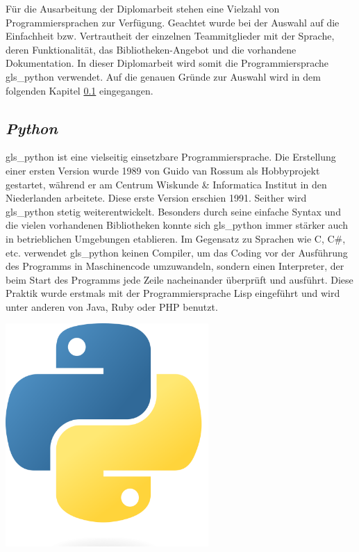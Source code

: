 Für die Ausarbeitung der Diplomarbeit stehen eine Vielzahl von Programmiersprachen zur Verfügung. Geachtet wurde bei der Auswahl auf die Einfachheit bzw. Vertrautheit der einzelnen Teammitglieder mit der Sprache, deren Funktionalität, das Bibliotheken-Angebot und die vorhandene Dokumentation. In dieser Diplomarbeit wird somit die Programmiersprache \gls{gls_python} verwendet. Auf die genauen Gründe zur Auswahl wird in dem folgenden Kapitel \ref{python_kapitel} eingegangen.

\subsection{\textit{Python}}\label{python_kapitel}
\begin{minipage}{0.6\textwidth}
	\gls{gls_python} ist eine vielseitig einsetzbare Programmiersprache. Die Erstellung einer ersten Version wurde 1989 von Guido van Rossum als Hobbyprojekt gestartet, während er am Centrum Wiskunde \& Informatica Institut in den Niederlanden arbeitete. Diese erste Version erschien 1991. Seither wird \gls{gls_python} stetig weiterentwickelt. Besonders durch seine einfache Syntax und die vielen vorhandenen Bibliotheken konnte sich \gls{gls_python} immer stärker auch in betrieblichen Umgebungen etablieren. Im Gegensatz zu Sprachen wie C, C\#, etc. verwendet \gls{gls_python} keinen Compiler, um das Coding vor der Ausführung des Programms in Maschinencode umzuwandeln, sondern einen Interpreter, der beim Start des Programms jede Zeile nacheinander überprüft und ausführt. Diese Praktik wurde erstmals mit der Programmiersprache Lisp eingeführt und wird unter anderen von Java, Ruby oder PHP benutzt. 
	\cite[vgl.][]{Python_Software_Foundation:o.J., Pramanick_gfg:2019, Ryte:2021}
\end{minipage}%
\hfill
\begin{minipage}{0.37\textwidth}
	\centering	
	\includegraphics[width=0.58\textwidth]{Bilder/Python_logo}
\end{minipage}
\vspace{1ex}

